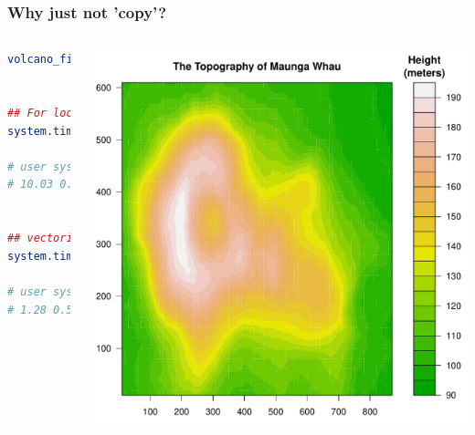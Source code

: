 \documentclass{beamer}
\begin{document}
\begin{frame}[fragile]
\frametitle{Why just not 'copy'?}

\begin{columns}[c]
\begin{lstlisting}[language = R]
volcano_filled.contour()


## For loop 
system.time(grid.echo())

# user system elapsed
# 10.03 0.23 10.32


## vectorizetion
system.time(grid.echo())

# user system elapsed
# 1.28 0.53 1.82
\end{lstlisting}

\begin{center}
\includegraphics{plot/filled_example_1}
\end{center}

\end{columns}
\end{frame}



\end{document}

